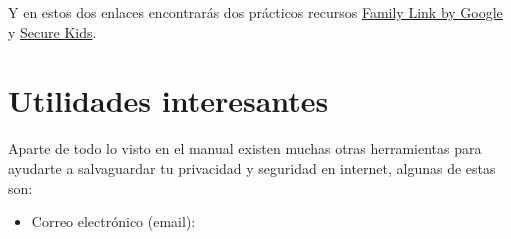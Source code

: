 \documentclass[
  a4paper,
  openany]{book}
\begin{document}
Y en estos dos enlaces encontrarás dos prácticos recursos \href{https://families.google.com/familylink/}{Family Link by Google} y \href{https://securekids.es/}{Secure Kids}.

\hypertarget{utilidades-interesantes}{%
\section{Utilidades interesantes}\label{utilidades-interesantes}}

Aparte de todo lo visto en el manual existen muchas otras herramientas para ayudarte a salvaguardar tu privacidad y seguridad en internet, algunas de estas son:

\begin{itemize}
\item
  Correo electrónico (email):


\end{itemize}
\end{document}
